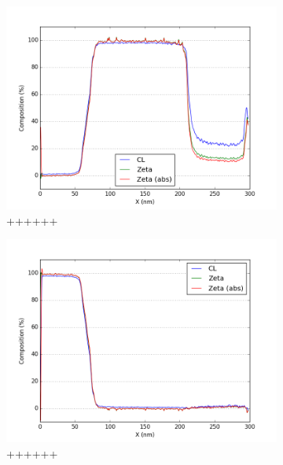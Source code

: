 \begin{figure}
	\begin{subfigure}{.5\textwidth}
		\centering
		\includegraphics[width=\linewidth]{fig/q/2_ge}
		\caption{++++++}
		\label{fig:zeta_area1_ga}
	\end{subfigure}%
	\begin{subfigure}{.5\textwidth}
		\centering
		\includegraphics[width=\linewidth]{fig/q/2_pd}
		\caption{++++++}
		\label{fig:zeta_area1_as}
	\end{subfigure}
	\begin{subfigure}{.5\textwidth}
		\centering

\end{subfigure}
\end{figure}

